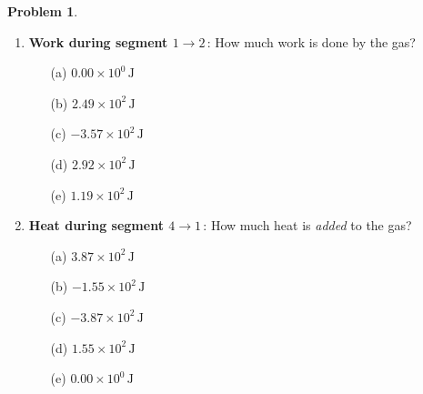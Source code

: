 \documentclass[10pt]{article}
\theoremstyle{definition} %
\newtheorem{problem}{Problem}
\theoremstyle{plain} %
\begin{document}
\begin{problem}
                                                  \begin{enumerate}
                                                    \item \textbf{Work during segment $1 \rightarrow 2$}\,:  
                                                          How much work is done by the gas?
                                                          \begin{enumerate}
                                                            \item[(a)] $0.00\times10^{0}\,\text{J}$
                                                            \item[(b)] $2.49\times10^{2}\,\text{J}$
                                                            \item[(c)] $-3.57\times10^{2}\,\text{J}$
                                                            \item[(d)] $2.92\times10^{2}\,\text{J}$
                                                            \item[(e)] $1.19\times10^{2}\,\text{J}$
                                                          \end{enumerate}
                                                  
                                                    \item \textbf{Heat during segment $4 \rightarrow 1$}\,:  
                                                          How much heat is \emph{added} to the gas?
                                                          \begin{enumerate}
                                                            \item[(a)] $3.87\times10^{2}\,\text{J}$
                                                            \item[(b)] $-1.55\times10^{2}\,\text{J}$
                                                            \item[(c)] $-3.87\times10^{2}\,\text{J}$
                                                            \item[(d)] $1.55\times10^{2}\,\text{J}$
                                                            \item[(e)] $0.00\times10^{0}\,\text{J}$
                                                          \end{enumerate}
                                                  \end{enumerate}
                                                  \end{problem}
\end{document}

